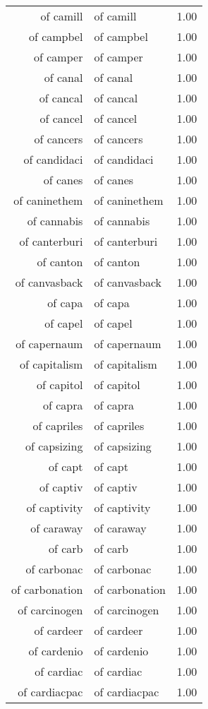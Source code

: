 \begin{table}[ht]
\begin{tabular}{rlr}
  of camill & of camill & 1.00 \\ 
  of campbel & of campbel & 1.00 \\ 
  of camper & of camper & 1.00 \\ 
  of canal & of canal & 1.00 \\ 
  of cancal & of cancal & 1.00 \\ 
  of cancel & of cancel & 1.00 \\ 
  of cancers & of cancers & 1.00 \\ 
  of candidaci & of candidaci & 1.00 \\ 
  of canes & of canes & 1.00 \\ 
  of caninethem & of caninethem & 1.00 \\ 
  of cannabis & of cannabis & 1.00 \\ 
  of canterburi & of canterburi & 1.00 \\ 
  of canton & of canton & 1.00 \\ 
  of canvasback & of canvasback & 1.00 \\ 
  of capa & of capa & 1.00 \\ 
  of capel & of capel & 1.00 \\ 
  of capernaum & of capernaum & 1.00 \\ 
  of capitalism & of capitalism & 1.00 \\ 
  of capitol & of capitol & 1.00 \\ 
  of capra & of capra & 1.00 \\ 
  of capriles & of capriles & 1.00 \\ 
  of capsizing & of capsizing & 1.00 \\ 
  of capt & of capt & 1.00 \\ 
  of captiv & of captiv & 1.00 \\ 
  of captivity & of captivity & 1.00 \\ 
  of caraway & of caraway & 1.00 \\ 
  of carb & of carb & 1.00 \\ 
  of carbonac & of carbonac & 1.00 \\ 
  of carbonation & of carbonation & 1.00 \\ 
  of carcinogen & of carcinogen & 1.00 \\ 
  of cardeer & of cardeer & 1.00 \\ 
  of cardenio & of cardenio & 1.00 \\ 
  of cardiac & of cardiac & 1.00 \\ 
  of cardiacpac & of cardiacpac & 1.00 \\ 

\end{tabular}
\end{table}
